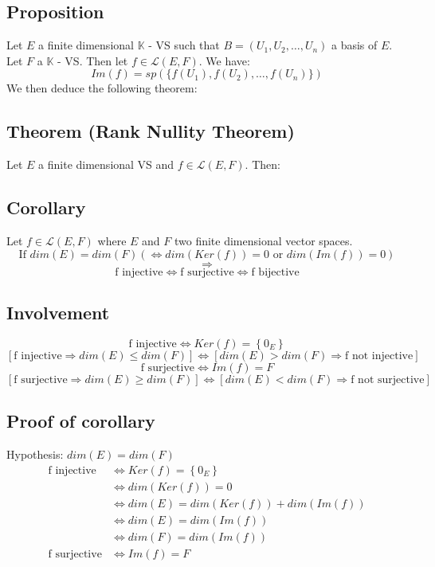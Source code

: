 \documentclass[notitlepage]{math}
\begin{document}
\subsection{Proposition}
Let $E$ a finite dimensional $\mathbb{K}$ - VS such that $B = (U_1, U_2, \dots, U_n)$ a basis of $E$. Let $F$ a $\mathbb{K}$ - VS.
Then let $f \in \mathcal{L}(E,F)$.
We have: \[Im (f) = sp(\{f(U_1), f(U_2), \dots, f(U_n)\})\]
We then deduce the following theorem: 
\subsection{Theorem (Rank Nullity Theorem)} 
Let $E$ a finite dimensional VS and $f \in \mathcal{L}(E,F)$. Then: \\
\subsection{Corollary}
Let $f \in \mathcal{L}(E,F)$ where $E$ and $F$ two finite dimensional vector spaces.
\[\text{If } dim(E) = dim(F) (\Longleftrightarrow dim(Ker(f)) = 0 \text{ or } dim(Im(f)) = 0)\]
\[\Longrightarrow\]
\[\text{f injective} \Longleftrightarrow \text{f surjective} \Longleftrightarrow \text{f bijective}\]
\subsection{Involvement}
\[\text{f injective} \Longleftrightarrow Ker(f) = \left\{ 0_E \right\}\]
\[\left[ \text{f injective} \Longrightarrow dim(E) \le dim(F) \right] \Longleftrightarrow \left[ dim(E) > dim(F) \Longrightarrow \text{f not injective} \right]\]
\[\text{f surjective} \Longleftrightarrow Im(f) = F\]
\[\left[ \text{f surjective} \Longrightarrow dim(E) \ge dim(F) \right] \Longleftrightarrow \left[ dim(E) < dim(F) \Longrightarrow \text{f not surjective} \right]\]
\subsection{Proof of corollary}
Hypothesis: $dim(E) = dim(F)$ 
\begin{align*}
\text{f injective} &\Longleftrightarrow Ker(f) = \left\{ 0_E \right\} \\
&\Longleftrightarrow dim(Ker(f)) = 0 \\
&\Longleftrightarrow dim(E) = dim(Ker(f)) + dim(Im(f)) \\
&\Longleftrightarrow dim(E) = dim(Im(f)) \\
&\Longleftrightarrow dim(F) = dim(Im(f)) \\
\text{f surjective} &\Longleftrightarrow Im(f) = F 
\end{align*}
\end{document}
